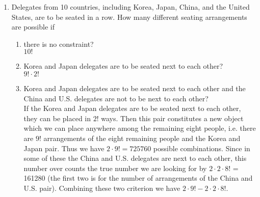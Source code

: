 \documentclass[12pt]{article}%
\newcommand{\0}{{\bf 0}}
\begin{document}
\begin{enumerate}
\item
Delegates from 10 countries, including Korea, Japan, China, and the United States, are to be seated in a row. 
How many different seating arrangements are possible if 
\begin{enumerate}
\item there is no constraint?
\\
{\color{blue}{\bf Sol.}}
$10!$

\item Korea and Japan delegates are to be seated next to each other?
\\
{\color{blue}{\bf Sol.}}
$9!\cdot2!$
\item Korea and Japan delegates are to be seated next to each other and the China and U.S. delegates are not to be next to each other?
\\
{\color{blue}{\bf Sol.}}
If the Korea and Japan delegates are to be seated next to each other, they can be
placed in $2!$ ways. Then this pair constitutes a new object which we can place anywhere
among the remaining eight people, i.e. there are $9!$ arrangements of the eight remaining
people and the Korea and Japan pair. Thus we have $2\cdot9! = 725760$ possible combinations.
Since in some of these the China and U.S. delegates are next to each other, this number
over counts the true number we are looking for by $2 \cdot 2\cdot8!$ = 161280 (the first two is for the
number of arrangements of the China and U.S. pair). Combining these two criterion we
have $2\cdot9! - 2 \cdot 2\cdot8!$.
\end{enumerate}






\end{enumerate}
\end{document}
